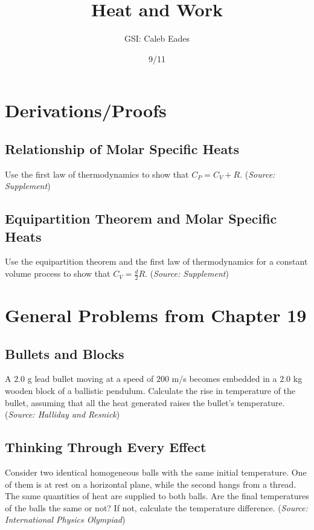 \documentclass{article}
\begin{document}
	
\title{Heat and Work}
\author{GSI: Caleb Eades}
\date{9/11}
\maketitle

\section{Derivations/Proofs}

\subsection{Relationship of Molar Specific Heats}

Use the first law of thermodynamics to show that $C_P = C_V + R$. (\textit{Source: Supplement})

\subsection{Equipartition Theorem and Molar Specific Heats}

Use the equipartition theorem and the first law of thermodynamics for a constant volume process to show that $C_V = \frac{d}{2}R$. (\textit{Source: Supplement})

\newpage

\section{General Problems from Chapter 19}

\subsection{Bullets and Blocks}

A $2.0$ g lead bullet moving at a speed of $200$ m/s becomes embedded in a $2.0$ kg wooden block of a ballistic pendulum. Calculate the rise in temperature of the bullet, assuming that all the heat generated raises the bullet's temperature. (\textit{Source: Halliday and Resnick})

\subsection{Thinking Through Every Effect}

Consider two identical homogeneous balls with the same initial temperature. One of them is at rest on a horizontal plane, while the second hangs from a thread. The same quantities of heat are supplied to both balls. Are the final temperatures of the balls the same or not? If not, calculate the temperature difference. (\textit{Source: International Physics Olympiad})
\end{document}
